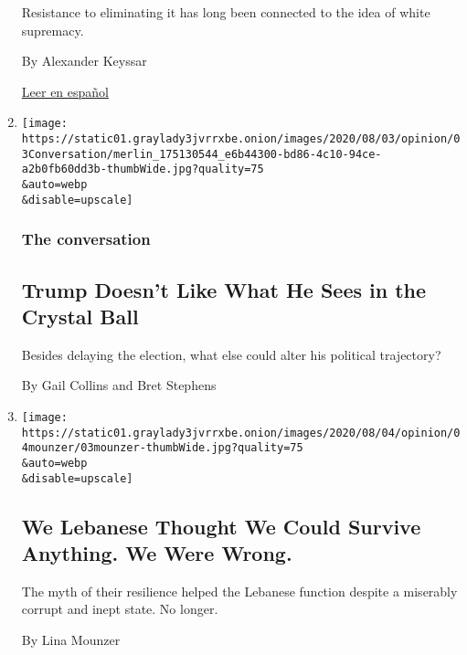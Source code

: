 \begin{enumerate}
  Resistance to eliminating it has long been connected to the idea of
  white supremacy.

  By Alexander Keyssar

  \href{https://www.nytimes3xbfgragh.onion/es/2020/08/03/espanol/opinion/colegio-electoral-estados-unidos.html}{Leer
  en español}
\item
  \href{/2020/08/03/opinion/trump-biden-2020.html}{}

  \texttt{[image: https://static01.graylady3jvrrxbe.onion/images/2020/08/03/opinion/03Conversation/merlin\_175130544\_e6b44300-bd86-4c10-94ce-a2b0fb60dd3b-thumbWide.jpg?quality=75\\\&auto=webp\\\&disable=upscale]}

  \hypertarget{the-conversation}{%
  \subsubsection{The conversation}\label{the-conversation}}

  \hypertarget{trump-doesnt-like-what-he-sees-in-the-crystal-ball}{%
  \subsection{Trump Doesn't Like What He Sees in the Crystal
  Ball}\label{trump-doesnt-like-what-he-sees-in-the-crystal-ball}}

  Besides delaying the election, what else could alter his political
  trajectory?

  By Gail Collins and Bret Stephens
\item
  \href{/2020/08/03/opinion/lebanon-coronavirus-economy.html}{}

  \texttt{[image: https://static01.graylady3jvrrxbe.onion/images/2020/08/04/opinion/04mounzer/03mounzer-thumbWide.jpg?quality=75\\\&auto=webp\\\&disable=upscale]}

  \hypertarget{we-lebanese-thought-we-could-survive-anything-we-were-wrong}{%
  \subsection{We Lebanese Thought We Could Survive Anything. We Were
  Wrong.}\label{we-lebanese-thought-we-could-survive-anything-we-were-wrong}}

  The myth of their resilience helped the Lebanese function despite a
  miserably corrupt and inept state. No longer.

  By Lina Mounzer
\end{enumerate}

